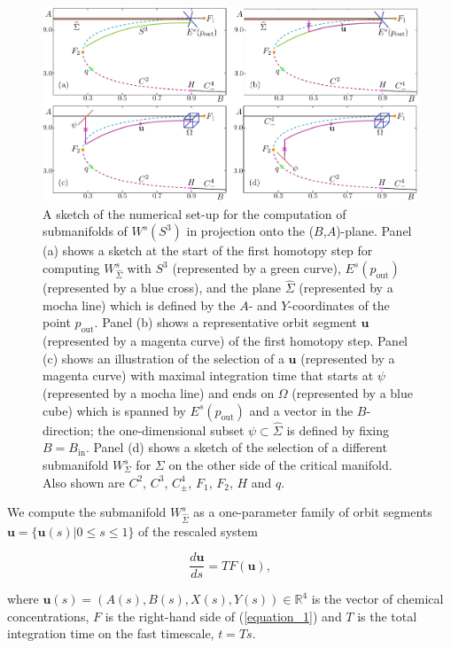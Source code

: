 \documentclass{ws-ijbc}
\begin{document}
\begin{figure}[h]
\centering
\includegraphics[]{./figures/MKMO_3.pdf}
\caption{A sketch of the numerical set-up for the computation of submanifolds of $W^s(S^3)$ in projection onto the ($B$,$A$)-plane.  Panel (a) shows a sketch at the start of the first homotopy step for computing $W^{s}_{\widehat{\Sigma}}$ with $S^3$ (represented by a green curve), $E^s(p_{\text{out}})$ (represented by a blue cross), and the plane $\widehat{\Sigma}$ (represented by a mocha line) which is defined by the $A$- and $Y$-coordinates of the point $p_{\text{out}}$.  Panel (b) shows a representative orbit segment $\mathbf{u}$ (represented by a magenta curve) of the first homotopy step.  Panel (c) shows an illustration of the selection of a $\mathbf{u}$ (represented by a magenta curve) with maximal integration time that starts at $\psi$ (represented by a mocha line) and ends on $\Omega$ (represented by a blue cube) which is spanned by $E^s(p_{\text{out}})$ and a vector in the $B$-direction; the one-dimensional subset $\psi \subset \widehat{\Sigma}$ is defined by fixing $B = B_{\text{in}}$.  Panel (d) shows a sketch of the selection of a different submanifold $W^{s}_{\Sigma}$ for $\Sigma$ on the other side of the critical manifold.  Also shown are $C^2$, $C^3$, $C^4_\pm$, $F_1$, $F_2$, $H$ and $q$.}
\label{figure_3}
\end{figure}


We compute the submanifold $W^s_{\widehat{\Sigma}}$ as a one-parameter family of orbit segments $\mathbf{u} = \{\mathbf{u}(s)| 0 \leq s \leq 1 \}$ of the rescaled system

\begin{equation}
\frac{d\mathbf{u}}{ds} = TF(\mathbf{u}),
\label{equation_4}
\end{equation}
    
\noindent
where $\mathbf{u}(s) = (A(s), B(s), X(s), Y(s)) \in \mathbb{R}^4$ is the vector of chemical concentrations, $F$ is the right-hand side of (\ref{equation_1}) and $T$ is the total integration time on the fast timescale, $t=Ts$.
    
\end{document}
